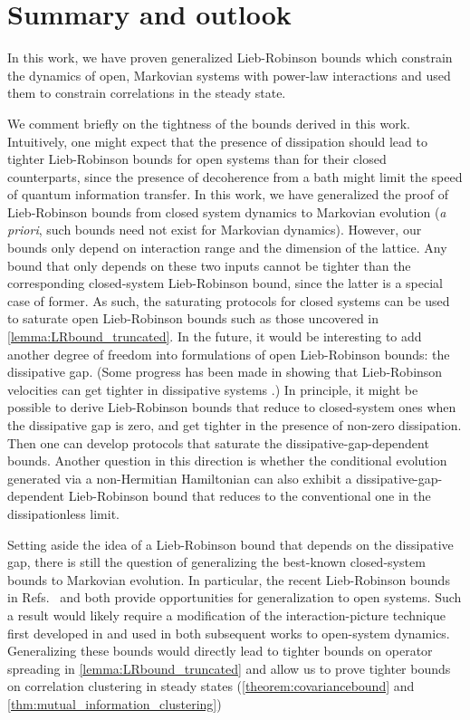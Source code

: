 \section{Summary and outlook}

In this work, we have proven generalized Lieb-Robinson bounds which constrain the dynamics of open, Markovian systems with power-law interactions and used them to constrain correlations in the steady state.

We comment briefly on the tightness of the bounds derived in this work. Intuitively, one might expect that the presence of dissipation should lead to tighter Lieb-Robinson bounds for open systems than for their closed counterparts, since the presence of decoherence from a bath might  limit the speed of quantum information transfer.
In this work, we have  generalized the proof of Lieb-Robinson bounds from closed system dynamics to Markovian evolution (\textit{a priori}, such bounds need not exist for Markovian dynamics).
However, our bounds only depend on interaction range and the dimension of the lattice.
Any bound that only depends on these two inputs cannot be tighter than the corresponding closed-system Lieb-Robinson bound, since the latter is a special case of former.
As such, the saturating protocols for closed systems \cite{Tran2020hierarchylinearlightcones,Tran2021a} can be used to saturate open Lieb-Robinson bounds such as those uncovered in  \cref{lemma:LRbound_truncated}.
In the future, it would be interesting to add another degree of freedom into formulations of open Lieb-Robinson bounds: the dissipative gap. (Some progress has been made in showing that Lieb-Robinson velocities can get tighter in dissipative systems \cite{descamps2013}.)
In principle, it might be possible to derive Lieb-Robinson bounds that reduce to closed-system ones when the dissipative gap is zero, and get tighter in the presence of non-zero dissipation.
Then one can develop protocols that saturate the dissipative-gap-dependent bounds.
Another question in this direction is whether the conditional evolution generated via a non-Hermitian Hamiltonian can also exhibit a dissipative-gap-dependent Lieb-Robinson bound that reduces to the conventional one in the dissipationless limit.

Setting aside the idea of a Lieb-Robinson bound that depends on the dissipative gap, there is still the question of generalizing the best-known closed-system bounds to Markovian evolution. In particular, the recent Lieb-Robinson bounds in Refs.~\cite{kuwaharaStrictlyLinearLight2020} and \cite{Tran2021b} both provide opportunities for generalization to open systems.
Such a result would likely require a modification of the interaction-picture technique first developed in \cite{Foss-Feig2015} and used in both subsequent works to open-system dynamics.
Generalizing these bounds would directly lead to tighter bounds on operator spreading in \cref{lemma:LRbound_truncated} and allow us to prove tighter bounds on correlation clustering in steady states (\cref{theorem:covariancebound} and \cref{thm:mutual_information_clustering})

